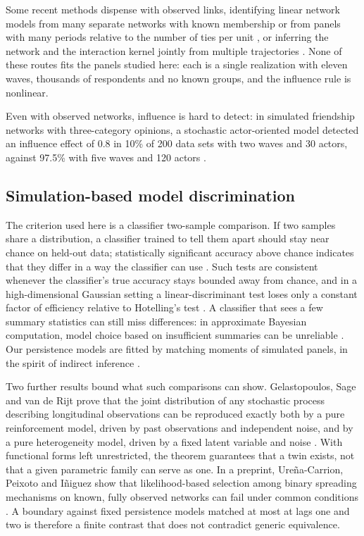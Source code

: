 Some recent methods dispense with observed links, identifying linear network models from many separate networks with known membership \cite{lewbel2023} or from panels with many periods relative to the number of ties per unit \cite{depaula2024}, or inferring the network and the interaction kernel jointly from multiple trajectories \cite{lang2026joint}. None of these routes fits the panels studied here: each is a single realization with eleven waves, thousands of respondents and no known groups, and the influence rule is nonlinear.

Even with observed networks, influence is hard to detect: in simulated friendship networks with three-category opinions, a stochastic actor-oriented model detected an influence effect of 0.8 in 10\% of 200 data sets with two waves and 30 actors, against 97.5\% with five waves and 120 actors \cite{stadtfeld2020}.

\subsection{Simulation-based model discrimination}\label{sec:bg-discrimination}

The criterion used here is a classifier two-sample comparison. If two samples share a distribution, a classifier trained to tell them apart should stay near chance on held-out data; statistically significant accuracy above chance indicates that they differ in a way the classifier can use \cite{lopezpaz2017}. Such tests are consistent whenever the classifier's true accuracy stays bounded away from chance, and in a high-dimensional Gaussian setting a linear-discriminant test loses only a constant factor of efficiency relative to Hotelling's test \cite{kim2021classifier}. A classifier that sees a few summary statistics can still miss differences: in approximate Bayesian computation, model choice based on insufficient summaries can be unreliable \cite{robert2011}. Our persistence models are fitted by matching moments of simulated panels, in the spirit of indirect inference \cite{gourieroux1993}.

Two further results bound what such comparisons can show. Gelastopoulos, Sage and van de Rijt prove that the joint distribution of any stochastic process describing longitudinal observations can be reproduced exactly both by a pure reinforcement model, driven by past observations and independent noise, and by a pure heterogeneity model, driven by a fixed latent variable and noise \cite{gelastopoulos2025}. With functional forms left unrestricted, the theorem guarantees that a twin exists, not that a given parametric family can serve as one. In a preprint, Ure\~{n}a-Carrion, Peixoto and I\~{n}iguez show that likelihood-based selection among binary spreading mechanisms on known, fully observed networks can fail under common conditions \cite{urena2026}. A boundary against fixed persistence models matched at most at lags one and two is therefore a finite contrast that does not contradict generic equivalence.

